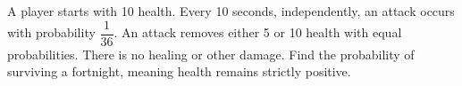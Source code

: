 A player starts with 10 health. Every 10 seconds, independently, an attack occurs with probability $\dfrac{1}{36}$. An attack removes either 5 or 10 health with equal probabilities. There is no healing or other damage. Find the probability of surviving a fortnight, meaning health remains strictly positive.
